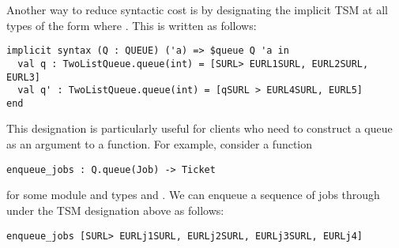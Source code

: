 Another way to reduce syntactic cost is by designating  the implicit TSM at all types of the form  where . This is written as follows:
\begin{lstlisting}[numbers=none]
implicit syntax (Q : QUEUE) ('a) => $queue Q 'a in
  val q : TwoListQueue.queue(int) = [SURL> EURL1SURL, EURL2SURL, EURL3]
  val q' : TwoListQueue.queue(int) = [qSURL > EURL4SURL, EURL5]
end
\end{lstlisting}
This designation is particularly useful for clients who need to construct a queue as an argument to a function. For example, consider a function 
\begin{lstlisting}[numbers=none]
enqueue_jobs : Q.queue(Job) -> Ticket
\end{lstlisting}
for some module  and types  and . We can enqueue a sequence of jobs  through  under the TSM designation above as follows:
\begin{lstlisting}[numbers=none]
enqueue_jobs [SURL> EURLj1SURL, EURLj2SURL, EURLj3SURL, EURLj4]
\end{lstlisting}


